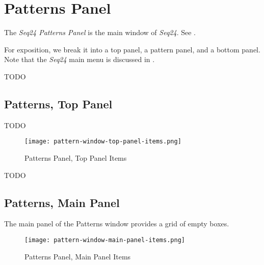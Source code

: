 %
%
%

\section{Patterns Panel}
\label{sec:seq24_patterns_panel}

   The \textsl{Seq24 Patterns Panel} is the main window of \textsl{Seq24}.
   See .

   For exposition, we break it into a top panel, a pattern panel, and a
   bottom panel.    Note that the \textsl{Seq24} main menu is discussed in
   .

   TODO

\subsection{Patterns, Top Panel}
\label{subsec:seq24_patterns_panel_top}

   TODO

\begin{figure}[H]
   \centering 
   \texttt{[image: pattern-window-top-panel-items.png]}
   \caption{Patterns Panel, Top Panel Items}
   \label{fig:pattern_window_top_panel_items}
\end{figure}

   TODO

\subsection{Patterns, Main Panel}
\label{subsec:seq24_patterns_panel_main}

   The main panel of the Patterns window provides a grid of empty boxes.

\begin{figure}[H]
   \centering 
   \texttt{[image: pattern-window-main-panel-items.png]}
   \caption{Patterns Panel, Main Panel Items}
   \label{fig:pattern_window_main_panel_items}
\end{figure}

